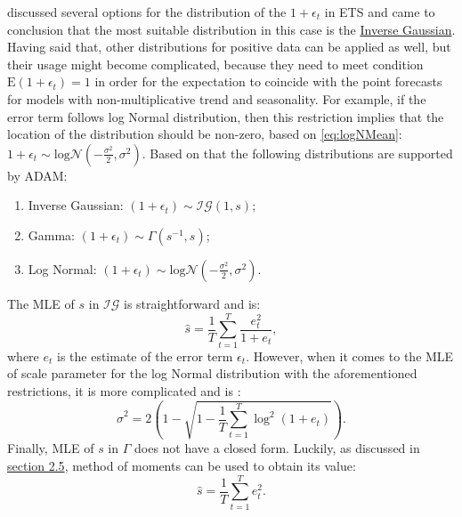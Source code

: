 \documentclass[
]{book}
\providecommand{\tightlist}{%
  \setlength{\itemsep}{0pt}\setlength{\parskip}{0pt}}
\theoremstyle{definition}
\theoremstyle{definition}
\theoremstyle{definition}
\theoremstyle{definition}
\theoremstyle{remark}
\begin{document}
\citet{Svetunkov2020ETS} discussed several options for the distribution of the \(1+\epsilon_t\) in ETS and came to conclusion that the most suitable distribution in this case is the \protect\hyperlink{IGDistribution}{Inverse Gaussian}. Having said that, other distributions for positive data can be applied as well, but their usage might become complicated, because they need to meet condition \(\mathrm{E}(1+\epsilon_t)=1\) in order for the expectation to coincide with the point forecasts for models with non-multiplicative trend and seasonality. For example, if the error term follows log Normal distribution, then this restriction implies that the location of the distribution should be non-zero, based on \eqref{eq:logNMean}: \(1+\epsilon_t\sim\mathrm{log}\mathcal{N}\left(-\frac{\sigma^2}{2},\sigma^2\right)\). Based on that the following distributions are supported by ADAM:

\begin{enumerate}
\def\labelenumi{\arabic{enumi}.}
\tightlist
\item
  Inverse Gaussian: \(\left(1+\epsilon_t \right) \sim \mathcal{IG}(1, s)\);
\item
  Gamma: \(\left(1+\epsilon_t \right) \sim \mathcal{\Gamma}(s^{-1}, s)\);
\item
  Log Normal: \(\left(1+\epsilon_t \right) \sim \mathrm{log}\mathcal{N}\left(-\frac{\sigma^2}{2}, \sigma^2\right)\).
\end{enumerate}

The MLE of \(s\) in \(\mathcal{IG}\) is straightforward and is:
\begin{equation}
    \hat{s} = \frac{1}{T} \sum_{t=1}^{T} \frac{e_{t}^2}{1+e_t} ,
    \label{eq:ETSMultiplicativeErrorMLESigmaIG}
\end{equation}
where \(e_t\) is the estimate of the error term \(\epsilon_t\). However, when it comes to the MLE of scale parameter for the log Normal distribution with the aforementioned restrictions, it is more complicated and is \citep{Svetunkov2020ETS}:
\begin{equation}
    \hat{\sigma}^2 = 2\left(1-\sqrt{ 1-\frac{1}{T} \sum_{t=1}^{T} \log^2(1+e_{t})}\right).
    \label{eq:ETSMultiplicativeErrorMLESigmaLogN}
\end{equation}
Finally, MLE of \(s\) in \(\mathcal{\Gamma}\) does not have a closed form. Luckily, as discussed in \protect\hyperlink{GammaDistribution}{section 2.5}, method of moments can be used to obtain its value:
\begin{equation}
    \hat{s} = \frac{1}{T} \sum_{t=1}^{T} e_{t}^2 .
    \label{eq:ETSMultiplicativeErrorMLESigmaGamma}
\end{equation}
\end{document}
